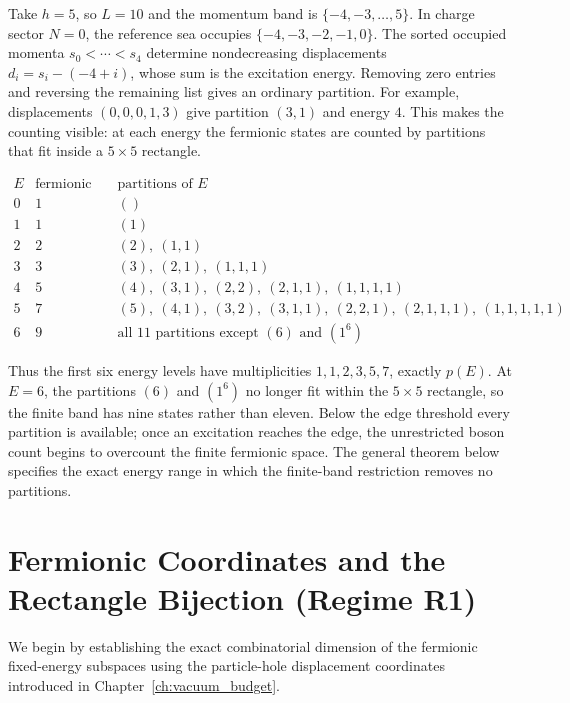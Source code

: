 \begin{remark}
Take $h=5$, so $L=10$ and the momentum band is $\{-4,-3,\ldots,5\}$.
In charge sector $N=0$, the reference sea occupies $\{-4,-3,-2,-1,0\}$.
The sorted occupied momenta $s_0<\cdots<s_4$ determine nondecreasing
displacements $d_i=s_i-(-4+i)$, whose sum is the excitation energy. Removing
zero entries and reversing the remaining list gives an ordinary partition.
For example, displacements $(0,0,0,1,3)$ give partition $(3,1)$ and energy
$4$. This makes the counting visible: at each energy the fermionic states
are counted by partitions that fit inside a $5\times5$ rectangle.

\begin{equation}
\begin{array}{c|c|l}
E & \text{fermionic multiplicity} & \text{partitions of }E \\ \hline
0&1&() \\
1&1&(1) \\
2&2&(2),\ (1,1) \\
3&3&(3),\ (2,1),\ (1,1,1) \\
4&5&(4),\ (3,1),\ (2,2),\ (2,1,1),\ (1,1,1,1) \\
5&7&(5),\ (4,1),\ (3,2),\ (3,1,1),\ (2,2,1),\ (2,1,1,1),\ (1,1,1,1,1) \\
6&9&\text{all 11 partitions except }(6)\text{ and }(1^6)
\end{array}
\end{equation}

Thus the first six energy levels have multiplicities
$1,1,2,3,5,7$, exactly $p(E)$. At $E=6$, the partitions $(6)$ and
$(1^6)$ no longer fit within the $5\times5$ rectangle, so the finite band
has nine states rather than eleven. Below the edge threshold every
partition is available; once an excitation reaches the edge, the
unrestricted boson count begins to overcount the finite fermionic space.
The general theorem below specifies the exact energy range in which the
finite-band restriction removes no partitions.
\end{remark}

\section{Fermionic Coordinates and the Rectangle Bijection (Regime R1)}

We begin by establishing the exact combinatorial dimension of the fermionic fixed-energy subspaces using the particle-hole displacement coordinates introduced in Chapter~\ref{ch:vacuum_budget}.

